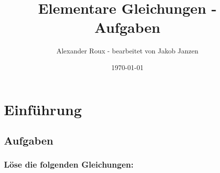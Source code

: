 \documentclass[a4paper,10pt]{article} %
\begin{document}
\title{Elementare Gleichungen - Aufgaben} %
\author{Alexander Roux - bearbeitet von Jakob Janzen} %
\date{\today} %
\maketitle %

\tableofcontents %

\newpage %

\section{Einführung}

\subsection{Aufgaben}

\subsubsection{Löse die folgenden Gleichungen:} %
\end{document}
